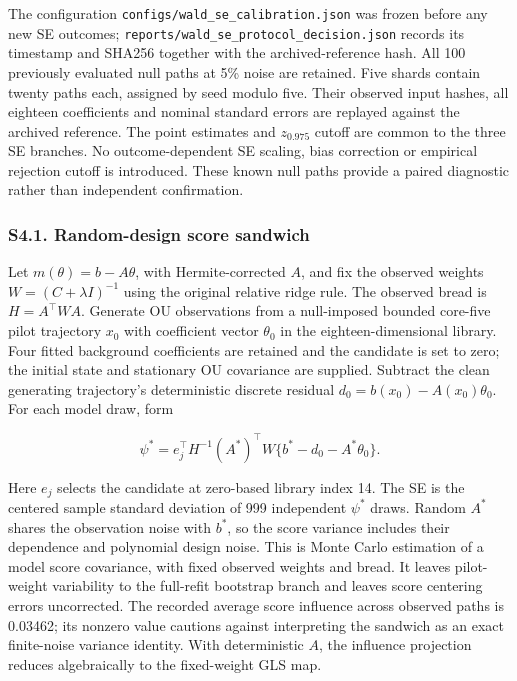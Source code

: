 \documentclass[
  american,
  11pt,
]{article}
\begin{document}
The configuration \texttt{configs/wald\_se\_calibration.json} was frozen
before any new SE outcomes;
\texttt{reports/wald\_se\_protocol\_decision.json} records its timestamp
and SHA256 together with the archived-reference hash. All 100 previously
evaluated null paths at 5\% noise are retained. Five shards contain
twenty paths each, assigned by seed modulo five. Their observed input
hashes, all eighteen coefficients and nominal standard errors are
replayed against the archived reference. The point estimates and
\(z_{0.975}\) cutoff are common to the three SE branches. No
outcome-dependent SE scaling, bias correction or empirical rejection
cutoff is introduced. These known null paths provide a paired diagnostic
rather than independent confirmation.

\subsubsection{S4.1. Random-design score
sandwich}\label{s4.1.-random-design-score-sandwich}

Let \(m(\theta)=b-A\theta\), with Hermite-corrected \(A\), and fix the
observed weights \(W=(C+\lambda I)^{-1}\) using the original relative
ridge rule. The observed bread is \(H=A^\top WA\). Generate OU
observations from a null-imposed bounded core-five pilot trajectory
\(x_0\) with coefficient vector \(\theta_0\) in the eighteen-dimensional
library. Four fitted background coefficients are retained and the
candidate is set to zero; the initial state and stationary OU covariance
are supplied. Subtract the clean generating trajectory's deterministic
discrete residual \(d_0=b(x_0)-A(x_0)\theta_0\). For each model draw,
form

\[
\psi^*=e_j^\top H^{-1}(A^*)^\top W\{b^*-d_0-A^*\theta_0\}.
\]

Here \(e_j\) selects the candidate at zero-based library index 14. The
SE is the centered sample standard deviation of 999 independent
\(\psi^*\) draws. Random \(A^*\) shares the observation noise with
\(b^*\), so the score variance includes their dependence and polynomial
design noise. This is Monte Carlo estimation of a model score
covariance, with fixed observed weights and bread. It leaves
pilot-weight variability to the full-refit bootstrap branch and leaves
score centering errors uncorrected. The recorded average score influence
across observed paths is 0.03462; its nonzero value cautions against
interpreting the sandwich as an exact finite-noise variance identity.
With deterministic \(A\), the influence projection reduces algebraically
to the fixed-weight GLS map.
\end{document}
